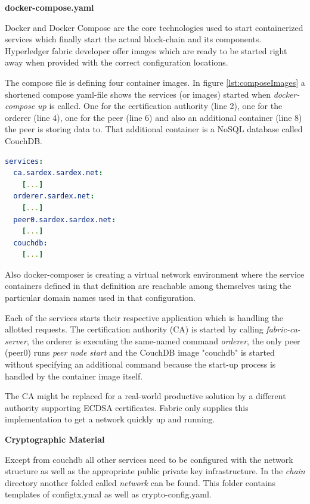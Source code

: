 \textbf{docker-compose.yaml}

Docker and Docker Compose are the core technologies used to start containerized services which finally start the actual block-chain and its components. Hyperledger fabric developer offer images which are ready to be started right away when provided with the correct configuration locations.

The compose file is defining four container images. In figure \ref{lst:composeImages} a shortened compose yaml-file shows the services (or images) started when \textit{docker-compose up} is called. One for the certification authority (line 2), one for the orderer (line 4), one for the peer (line 6) and also an additional container (line 8) the peer is storing data to. That additional container is a NoSQL database called CouchDB. 

\begin{center}
\begin{minipage}{0.8\textwidth}
\small
\begin{lstlisting}[language=yaml,firstnumber=1,caption={\bf\small docker-compose.yaml excerpt}, captionpos=b,label=lst:composeImages]
services:
  ca.sardex.sardex.net:
    [...]
  orderer.sardex.net:
    [...]
  peer0.sardex.sardex.net:
    [...]
  couchdb:
    [...]
\end{lstlisting}
\end{minipage}
\end{center}

Also docker-composer is creating a virtual network environment where the service containers defined in that definition are reachable among themselves using the particular domain names used in that configuration.

Each of the services starts their respective application which is handling the allotted requests. The certification authority (CA) is started by calling \textit{fabric-ca-server}, the orderer is executing the same-named command \textit{orderer}, the only peer (peer0) runs \textit{peer node start} and the CouchDB image "couchdb" is started without specifying an additional command because the start-up process is handled by the container image itself.   

The CA might be replaced for a real-world productive solution by a different authority supporting ECDSA certificates. Fabric only supplies this implementation to get a network quickly up and running.

\textbf{Cryptographic Material}

Except from couchdb all other services need to be configured with the network structure as well as the appropriate public private key infrastructure. In the \textit{chain} directory another folded called \textit{network} can be found. This folder contains templates of configtx.ymal as well as crypto-config.yaml. 

